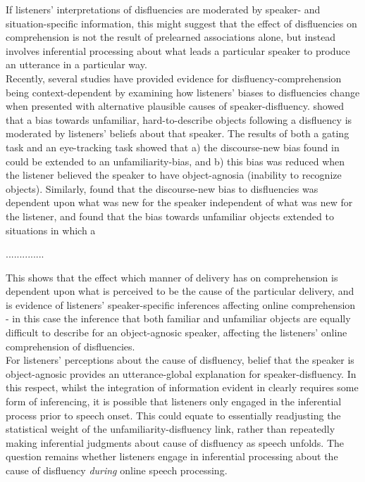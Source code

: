 \documentclass[man]{apa6}
\begin{document}
If listeners' interpretations of disfluencies are moderated by speaker- and situation-specific information, this might suggest that the effect of disfluencies on comprehension is not the result of prelearned associations alone, but instead involves inferential processing about what leads a particular speaker to produce an utterance in a particular way.\\







Recently, several studies have provided evidence for disfluency-comprehension being context-dependent by examining how listeners' biases to disfluencies change when presented with alternative plausible causes of speaker-disfluency. 
\citet{Arnold2007} showed that a bias towards unfamiliar, hard-to-describe objects following a disfluency is moderated by listeners' beliefs about that speaker. 
The results of both a gating task and an eye-tracking task showed that a) the discourse-new bias found in \citet{Arnold2004} could be extended to an unfamiliarity-bias, and b) this bias was reduced when the listener believed the speaker to have object-agnosia (inability to recognize objects). 
Similarly, \citet{Barr2010} found that the discourse-new bias to disfluencies was dependent upon what was new for the speaker independent of what was new for the listener, and \citet{Heller2015} found that the bias towards unfamiliar objects extended to situations in which a


..............


This shows that the effect which manner of delivery has on comprehension is dependent upon what is perceived to be the cause of the particular delivery, and is evidence of listeners' speaker-specific inferences affecting online comprehension - in this case the inference that both familiar and unfamiliar objects are equally difficult to describe for an object-agnosic speaker, affecting the listeners' online comprehension of disfluencies.\\

For listeners' perceptions about the cause of disfluency, belief that the speaker is object-agnosic provides an utterance-global explanation for speaker-disfluency. 
In this respect, whilst the integration of information evident in \citet{Arnold2007} clearly requires some form of inferencing, it is possible that listeners only engaged in the inferential process prior to speech onset. 
This could equate to essentially readjusting the statistical weight of the unfamiliarity-disfluency link, rather than repeatedly making inferential judgments about cause of disfluency as speech unfolds. 
The question remains whether listeners engage in inferential processing about the cause of disfluency \textit{during} online speech processing. \\
\end{document}

